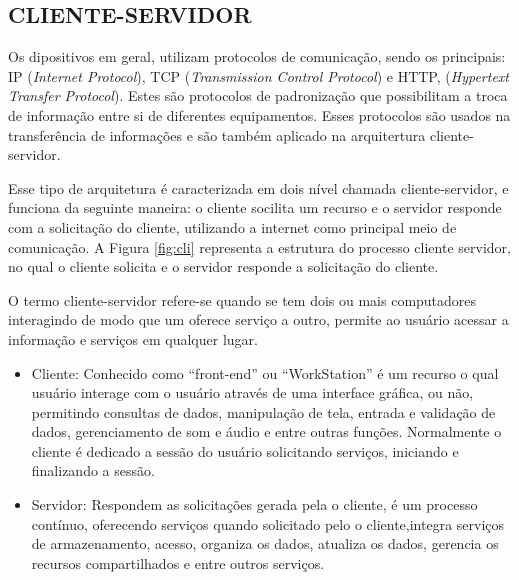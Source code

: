 \documentclass[12pt, a4paper]{article}
\begin{document}
\subsection{CLIENTE-SERVIDOR}

\hspace*{0.8cm}Os dipositivos em geral, utilizam protocolos de comunicação, sendo os principais: IP (\textit {Internet Protocol}), TCP (\textit {Transmission Control Protocol}) e HTTP, (\textit{Hypertext Transfer Protocol}). Estes são protocolos de padronização que possibilitam a troca de informação entre si de diferentes equipamentos. Esses protocolos são usados na transferência de informações e são também aplicado na arquitertura cliente-servidor.

\hspace*{0.8cm}Esse tipo de arquitetura é caracterizada em dois nível chamada cliente-servidor, e funciona da seguinte maneira: o cliente socilita um recurso e o servidor responde com a solicitação do cliente, utilizando  a internet como principal meio de comunicação. A Figura \ref{fig:cli} representa a estrutura do processo cliente servidor, no qual o cliente solicita e o servidor responde a solicitação do cliente.

O termo cliente-servidor refere-se quando se tem dois ou mais computadores interagindo de modo que um oferece serviço a outro, permite ao usuário acessar a informação e serviços em qualquer lugar. 
\begin{itemize}
\item Cliente: Conhecido como ``front-end'' ou ``WorkStation'' é um recurso o qual usuário interage com o usuário através de uma interface gráfica, ou não, permitindo consultas de dados, manipulação  de tela, entrada e validação de dados, gerenciamento de som e áudio e entre outras funções. Normalmente o cliente é dedicado a sessão do usuário solicitando serviços, iniciando e finalizando a sessão.
\item Servidor: Respondem as solicitações gerada pela o cliente, é um processo contínuo, oferecendo serviços quando solicitado pelo o cliente,integra serviços de armazenamento, acesso, organiza os dados, atualiza os dados, gerencia os recursos compartilhados e entre outros serviços. 

\end{itemize}
\end{document}
